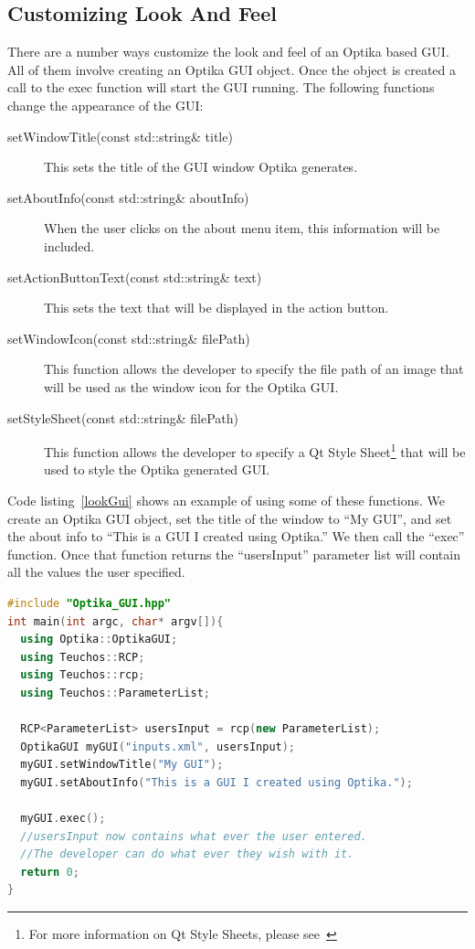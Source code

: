\subsection{Customizing Look And Feel}
There are a number ways customize the look and feel of an Optika based GUI. All of them involve creating an Optika GUI object. Once the object is created a call to the
exec function will start the GUI running. The following functions change the appearance of the GUI:
\begin{description}
\item[setWindowTitle(const std::string\& title)] This sets the title of the GUI window Optika generates.
\item[setAboutInfo(const std::string\& aboutInfo)] When the user clicks on the about menu item, this information will be included.
\item[setActionButtonText(const std::string\& text)] This sets the text that will be displayed in the action button.
\item[setWindowIcon(const std::string\& filePath)] This function allows the developer to specify the file path of an image that will be used as the window icon for the 
Optika GUI.
\item[setStyleSheet(const std::string\& filePath)] This function allows the developer to specify a Qt Style Sheet\footnote{For more information on Qt Style Sheets, please 
see~\cite{QtStyle}} that will be used to style the Optika generated GUI.
\end{description}

Code listing~\ref{lookGui} shows an example of using some of these functions. We create an Optika GUI object, set the title of the window to ``My GUI'', and set the
about info to ``This is a GUI I created using Optika.'' We then call the ``exec'' function. Once that function returns the ``usersInput'' parameter list will contain all 
the values the user specified.
\begin{lstlisting}[language=C++, caption={Example of customizing the look and feel of an Optika GUI}, label=lookGui]
#include "Optika_GUI.hpp"
int main(int argc, char* argv[]){
  using Optika::OptikaGUI;
  using Teuchos::RCP;
  using Teuchos::rcp;
  using Teuchos::ParameterList;

  RCP<ParameterList> usersInput = rcp(new ParameterList);
  OptikaGUI myGUI("inputs.xml", usersInput);
  myGUI.setWindowTitle("My GUI");
  myGUI.setAboutInfo("This is a GUI I created using Optika.");

  myGUI.exec();
  //usersInput now contains what ever the user entered.
  //The developer can do what ever they wish with it.
  return 0;
}
\end{lstlisting}

